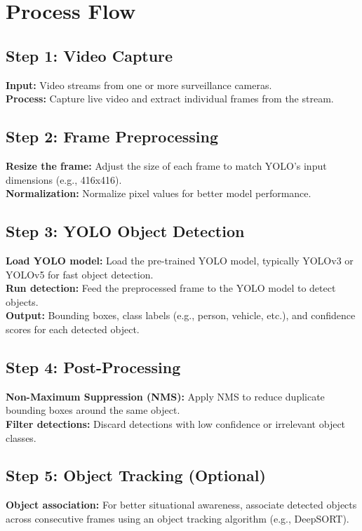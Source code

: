 \documentclass[openany,12pt]{report}
\begin{document}
\section*{Process Flow}

\subsection*{Step 1: Video Capture}
\textbf{Input:} Video streams from one or more surveillance cameras. \\
\textbf{Process:} Capture live video and extract individual frames from the stream.

\subsection*{Step 2: Frame Preprocessing}
\textbf{Resize the frame:} Adjust the size of each frame to match YOLO’s input dimensions (e.g., 416x416). \\
\textbf{Normalization:} Normalize pixel values for better model performance.

\subsection*{Step 3: YOLO Object Detection}
\textbf{Load YOLO model:} Load the pre-trained YOLO model, typically YOLOv3 or YOLOv5 for fast object detection. \\
\textbf{Run detection:} Feed the preprocessed frame to the YOLO model to detect objects. \\
\textbf{Output:} Bounding boxes, class labels (e.g., person, vehicle, etc.), and confidence scores for each detected object.

\subsection*{Step 4: Post-Processing}
\textbf{Non-Maximum Suppression (NMS):} Apply NMS to reduce duplicate bounding boxes around the same object. \\
\textbf{Filter detections:} Discard detections with low confidence or irrelevant object classes.

\subsection*{Step 5: Object Tracking (Optional)}
\textbf{Object association:} For better situational awareness, associate detected objects across consecutive frames using an object tracking algorithm (e.g., DeepSORT).
\end{document}
